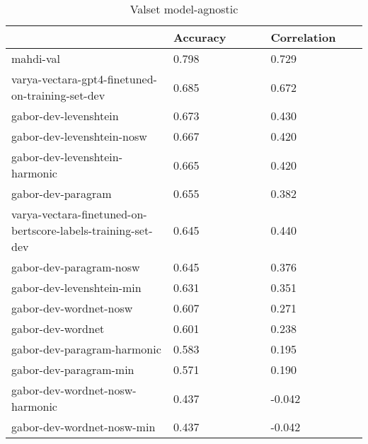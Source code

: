 \begin{table}
\centering
\caption{Valset model-agnostic}
\label{val-agnostic}
\begin{tabular}{|p{0.45\linewidth}|R{0.275\linewidth}|R{0.275\linewidth}|}
\hline
 & Accuracy & Correlation \\
\hline
mahdi-val & 0.798 & 0.729 \\
varya-vectara-gpt4-finetuned-on-training-set-dev & 0.685 & 0.672 \\
gabor-dev-levenshtein & 0.673 & 0.430 \\
gabor-dev-levenshtein-nosw & 0.667 & 0.420 \\
gabor-dev-levenshtein-harmonic & 0.665 & 0.420 \\
gabor-dev-paragram & 0.655 & 0.382 \\
varya-vectara-finetuned-on-bertscore-labels-training-set-dev & 0.645 & 0.440 \\
gabor-dev-paragram-nosw & 0.645 & 0.376 \\
gabor-dev-levenshtein-min & 0.631 & 0.351 \\
gabor-dev-wordnet-nosw & 0.607 & 0.271 \\
gabor-dev-wordnet & 0.601 & 0.238 \\
gabor-dev-paragram-harmonic & 0.583 & 0.195 \\
gabor-dev-paragram-min & 0.571 & 0.190 \\
gabor-dev-wordnet-nosw-harmonic & 0.437 & -0.042 \\
gabor-dev-wordnet-nosw-min & 0.437 & -0.042 \\
\hline
\end{tabular}
\end{table}
